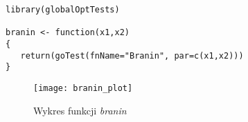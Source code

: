 \begin{lstlisting}[frame=single]
library(globalOptTests)

branin <- function(x1,x2)
{
   return(goTest(fnName="Branin", par=c(x1,x2)))
}
\end{lstlisting}

\begin{figure}[H]
	\centering
	\texttt{[image: branin\_plot]}
	\caption{Wykres funkcji \textit{branin}}  
	\label{rys:branin_plot} 
\end{figure}

\vline







\newpage